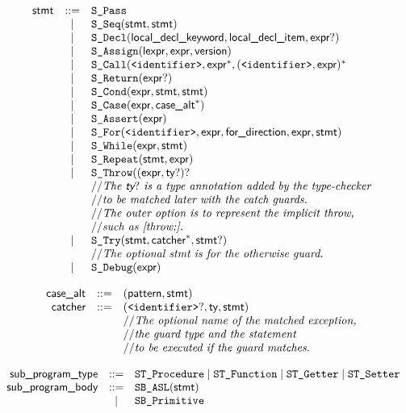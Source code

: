 \documentclass{book}
\begin{document}
\[
\begin{array}{rcl}
\textsf{stmt} &::=& \texttt{S\_Pass}\\
  &|& \texttt{S\_Seq}(\textsf{stmt}, \textsf{stmt})\\
  &|& \texttt{S\_Decl}(\textsf{local\_decl\_keyword}, \textsf{local\_decl\_item}, \textsf{expr}?)\\
  &|& \texttt{S\_Assign}(\textsf{lexpr}, \textsf{expr}, \textsf{version})\\
  &|& \texttt{S\_Call}(\texttt{<identifier>}, \textsf{expr}^*, (\texttt{<identifier>}, \textsf{expr})^*\\
  &|& \texttt{S\_Return}(\textsf{expr}?)\\
  &|& \texttt{S\_Cond}(\textsf{expr}, \textsf{stmt}, \textsf{stmt})\\
  &|& \texttt{S\_Case}(\textsf{expr}, \textsf{case\_alt}^*)\\
  &|& \texttt{S\_Assert}(\textsf{expr})\\
  &|& \texttt{S\_For}(\texttt{<identifier>}, \textsf{expr}, \textsf{for\_direction}, \textsf{expr}, \textsf{stmt})\\
  &|& \texttt{S\_While}(\textsf{expr}, \textsf{stmt})\\
  &|& \texttt{S\_Repeat}(\textsf{stmt}, \textsf{expr})\\
  &|& \texttt{S\_Throw}((\textsf{expr}, \textsf{ty}?)?\\
  & & // \textit{The $\textsf{ty}?$ is a type annotation added by the type-checker}\ \\
  & & // \textit{to be matched later with the catch guards.}\ \\
  & & // \textit{The outer option is to represent the implicit throw,}\ \\
  & & // \textit{such as [throw;].}\ \\
  &|& \texttt{S\_Try}(\textsf{stmt}, \textsf{catcher}^*, \textsf{stmt}?)\\
  & & // \textit{The optional stmt is for the otherwise guard.}\ \\
  &|& \texttt{S\_Debug}(\textsf{expr})
\end{array}
\]

\[
\begin{array}{rcl}
\textsf{case\_alt} &::=& (\textsf{pattern}, \textsf{stmt})\\
\textsf{catcher} &::=& (\texttt{<identifier>}?, \textsf{ty}, \textsf{stmt})\\
  & & // \textit{The optional name of the matched exception,}\ \\
  & & // \textit{the guard type and the statement}\ \\
  & & // \textit{to be executed if the guard matches.}\ \\
\end{array}
\]

\[
\begin{array}{rcl}
\textsf{sub\_program\_type} &::=& \texttt{ST\_Procedure} \;|\; \texttt{ST\_Function} \;|\; \texttt{ST\_Getter} \;|\; \texttt{ST\_Setter}\\
\textsf{sub\_program\_body} &::=& \texttt{SB\_ASL}(\textsf{stmt})\\
  &|& \texttt{SB\_Primitive}\\
\end{array}
\]
\end{document}
